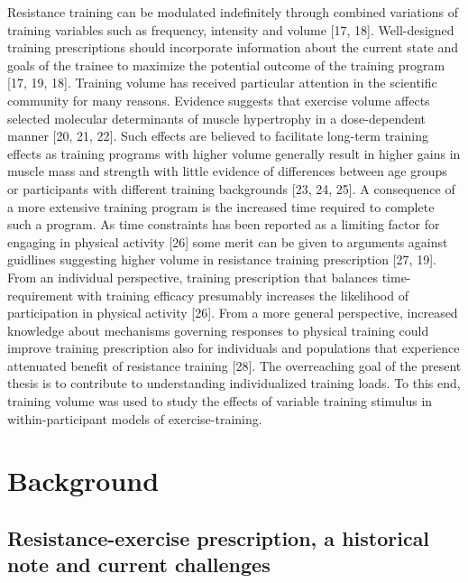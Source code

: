 \documentclass[twoside,10pt]{gihclass} %
\begin{document}
Resistance training can be modulated indefinitely through combined variations of training variables such as frequency, intensity and volume
{[}17, 18{]}.
Well-designed training prescriptions should incorporate information about the current state and goals of the trainee to maximize the potential outcome of the training program
{[}17, 19, 18{]}.
Training volume has received particular attention in the scientific community for many reasons. Evidence suggests that exercise volume affects selected molecular determinants of muscle hypertrophy in a dose-dependent manner
{[}20, 21, 22{]}.
Such effects are believed to facilitate long-term training effects as training programs with higher volume generally result in higher gains in muscle mass and strength with little evidence of differences between age groups or participants with different training backgrounds
{[}23, 24, 25{]}.
A consequence of a more extensive training program is the increased time required to complete such a program. As time constraints has been reported as a limiting factor for engaging in physical activity
{[}26{]}
some merit can be given to arguments against guidlines suggesting higher volume in resistance training prescription
{[}27, 19{]}.
From an individual perspective, training prescription that balances time-requirement with training efficacy presumably increases the likelihood of participation in physical activity {[}26{]}.
From a more general perspective, increased knowledge about mechanisms governing responses to physical training could improve training prescription also for individuals and populations that experience attenuated benefit of resistance training
{[}28{]}.
The overreaching goal of the present thesis is to contribute to understanding individualized training loads. To this end, training volume was used to study the effects of variable training stimulus in within-participant models of exercise-training.

\hypertarget{background}{%
\chapter{Background}\label{background}}

\hypertarget{resistance-exercise-prescription-a-historical-note-and-current-challenges}{%
\section{Resistance-exercise prescription, a historical note and current challenges}\label{resistance-exercise-prescription-a-historical-note-and-current-challenges}}
\end{document}
